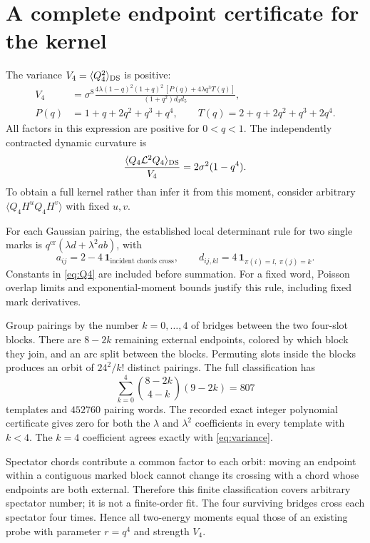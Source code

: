 \documentclass[11pt,a4paper]{article}
\newcommand{\av}[1]{\langle #1\rangle}
\begin{document}
\newpage
\section{A complete endpoint certificate for the kernel}
The variance $V_4=\av{Q_4^2}_{\rm DS}$ is positive:
\begin{align}\label{eq:variance}
 V_4&=\sigma^8
 \frac{4\lambda(1-q)^2(1+q)^2\,[P(q)+4\lambda q^3T(q)]}
 {(1+q^2)d_3d_5},\\
 P(q)&=1+q+2q^2+q^3+q^4,\qquad
 T(q)=2+q+2q^2+q^3+2q^4.\nonumber
\end{align}
All factors in this expression are positive for $0<q<1$.
The independently contracted dynamic curvature is
\begin{equation}
 \frac{\av{Q_4\mathcal L^2Q_4}_{\rm DS}}{V_4}
 =2\sigma^2(1-q^4).
\end{equation}
To obtain a full kernel rather than infer it from this moment,
consider arbitrary $\av{Q_4H^uQ_4H^v}$ with fixed $u,v$.

For each Gaussian pairing, the established local determinant rule
for two single marks is
$q^{\mathrm{cr}}(\lambda d+\lambda^2ab)$, with
\begin{equation}
 a_{ij}=2-4\,\mathbf1_{\text{incident chords cross}},\qquad
 d_{ij,kl}=4\,\mathbf1_{\pi(i)=l,\ \pi(j)=k}.
\end{equation}
Constants in \eqref{eq:Q4} are included before summation.
For a fixed word, Poisson overlap limits and exponential-moment
bounds justify this rule, including fixed mark derivatives.

Group pairings by the number $k=0,\ldots,4$ of bridges between
the two four-slot blocks. There are $8-2k$ remaining external
endpoints, colored by which block they join, and an arc split between
the blocks. Permuting slots inside the blocks produces an orbit of
$24^2/k!$ distinct pairings. The full classification has
\begin{equation}
 \sum_{k=0}^4\binom{8-2k}{4-k}(9-2k)=807
\end{equation}
templates and $452760$ pairing words. The recorded exact integer
polynomial certificate gives zero for both the $\lambda$ and
$\lambda^2$ coefficients in every template with $k<4$.
The $k=4$ coefficient agrees exactly with \eqref{eq:variance}.

Spectator chords contribute a common factor to each orbit: moving
an endpoint within a contiguous marked block cannot change its
crossing with a chord whose endpoints are both external. Therefore
this finite classification covers arbitrary spectator number; it is
not a finite-order fit. The four surviving bridges cross each
spectator four times. Hence all two-energy moments equal those of
an existing probe with parameter $r=q^4$ and strength $V_4$.
\end{document}
